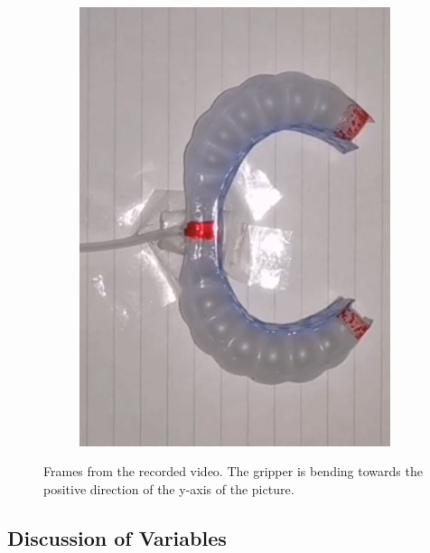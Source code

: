 \documentclass[conference]{IEEEtran}
\begin{document}
\begin{figure}[htbp]
\begin{subfigure}[b]{0.25\linewidth}
    \includegraphics[width=\linewidth]{pics/变形3.png}
    \caption{}
    \label{fig:image3}
  \end{subfigure}
  \caption{Frames from the recorded video. The gripper is bending towards the positive direction of the y-axis of the picture.}
  \label{fig:three_images}
\end{figure}



\subsection{Discussion of Variables}
\end{document}
